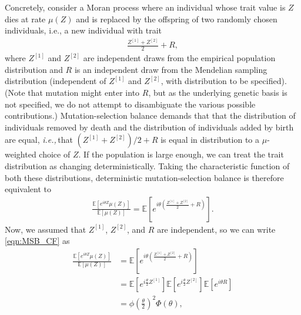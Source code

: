 \documentclass{article}
\newcommand{\E}{\mathbb{E}}
\newcommand{\R}{\mathbb{R}}
\newcommand{\ie}{\textit{i.e.,}\,}
\newcommand{\eg}{\textit{e.g.,}\,}
\newcommand{\1}{\mathbbm{1}}
\theoremstyle{remark}
\theoremstyle{definition}
\begin{document}
Concretely, consider a Moran process where an individual whose trait value is $Z$ dies at rate $\mu(Z)$
and is replaced by the offspring of two randomly chosen individuals,
i.e., a new individual with trait 
\begin{align*}
    \frac{Z^{[1]} +Z^{[2]}}{2} + R ,
\end{align*}
where $Z^{[1]}$ and $Z^{[2]}$ are independent draws from the empirical population distribution
and $R$ is an independent draw from the Mendelian sampling distribution
(independent of $Z^{[1]}$ and $Z^{[2]}$, with distribution to be specified). 
(Note that mutation might enter into $R$, but as the underlying genetic basis is not specified,
we do not attempt to disambiguate the various possible contributions.) 
Mutation-selection balance demands that that
the distribution of individuals removed by death
and the distribution of individuals added by birth are equal,
\ie that $(Z^{[1]} +Z^{[2]})/2 + R$ is equal in distribution
to a $\mu$-weighted choice of $Z$.
% 
If the population is large enough, 
we can treat the trait distribution as changing deterministically.
Taking the characteristic function of both these distributions,
deterministic mutation-selection balance is therefore equivalent to
\begin{align} \label{eqn:MSB_CF}
    \frac{\E\left[ e^{i \theta Z}\mu(Z) \right]}{\E[\mu(Z)]}
    =
    \E\left[ e^{i\theta\left(\frac{Z^{[1]} + Z^{[2]}}{2} + R \right)}\right] .
\end{align}
Now, we assumed that $Z^{[1]}$, $Z^{[2]}$, and $R$ are independent, so we can write \eqref{eqn:MSB_CF} as 
\begin{align*}
    \frac{\E\left[ e^{i\theta Z} \mu(Z) \right]}{\E[\mu(Z)]} &= \E\left[ e^{i\theta\left(\frac{Z^{[1]} +Z^{[2]}}{2} + R \right)}\right]\\
    &= \E\left[e^{i\frac{\theta}{2} Z^{[1]}}\right]\E\left[e^{i\frac{\theta}{2} Z^{[2]}}\right]\E\left[e^{i\theta R}\right]\\
	&= \phi\left(\frac{\theta}{2}\right)^{2} \Phi(\theta),
\end{align*}
\end{document}

